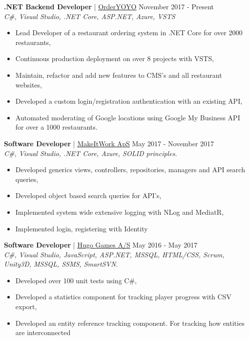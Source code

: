 \documentclass[margin, 10pt, hidelinks]{res} %
\newcommand{\emphasize}{\large\bfseries} %
\begin{document}
\begin{resume}
{\emphasize .NET Backend Developer} | \href{https://orderyoyo.com/}{\underline{OrderYOYO}}    \hfill November 2017 - Present  \\
{\it C\#, Visual Studio, .NET Core, ASP.NET, Azure, VSTS} %
\begin{itemize} \setlength{\itemindent}{-0.1in}\itemsep 0pt %
\item Lead Developer of a restaurant ordering system in .NET Core for over 2000 restaurants,
\item Continuous production deployment on over 8 projects with VSTS,
\item Maintain, refactor and add new features to CMS's and all restaurant websites,
\item Developed a custom login/registration authentication with an existing API,
\item Automated moderating of Google locations using Google My Business API for over a 1000 restaurants.
\end{itemize}

{\emphasize Software Developer} | \href{http://www.makeitwork.dk}{\underline{MakeItWork ApS}}  \hfill May 2017 - November 2017  \\
{\it C\#, Visual Studio, .NET Core, Azure, SOLID principles. } %
\begin{itemize} \setlength{\itemindent}{-0.1in}\itemsep 0pt %
\item Developed generics views, controllers, repositories, managers and API search queries,
\item Developed object based search queries for API's,
\item Implemented system wide extensive logging with NLog and MediatR,
\item Implemented login, registering with Identity
\end{itemize}

{\emphasize Software Developer} | \href{https://www.hugogames.com}{\underline{Hugo Games A/S}}   \hfill May 2016 - May 2017  \\
{\it C\#, Visual Studio, JavaScript, ASP.NET, MSSQL, HTML/CSS, Scrum, Unity3D, MSSQL, SSMS, SmartSVN.} %
\begin{itemize} \setlength{\itemindent}{-0.1in}\itemsep 0pt %
\item Developed over 100 unit tests using C\#,
\item Developed a statistics component for tracking player progress with CSV export,
\item Developed an entity reference tracking component. For tracking how entities are interconnected
\end{itemize}



\end{resume}
\end{document}
